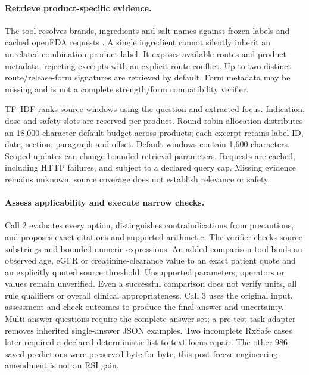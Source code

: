 \paragraph{Retrieve product-specific evidence.}
The tool resolves brands, ingredients and salt names against frozen labels and cached openFDA requests \citep{openfda}. A single ingredient cannot silently inherit an unrelated combination-product label. It exposes available routes and product metadata, rejecting excerpts with an explicit route conflict. Up to two distinct route/release-form signatures are retrieved by default. Form metadata may be missing and is not a complete strength/form compatibility verifier.

TF--IDF ranks source windows using the question and extracted focus. Indication, dose and safety slots are reserved per product. Round-robin allocation distributes an 18,000-character default budget across products; each excerpt retains label ID, date, section, paragraph and offset. Default windows contain 1,600 characters. Scoped updates can change bounded retrieval parameters. Requests are cached, including HTTP failures, and subject to a declared query cap. Missing evidence remains unknown; source coverage does not establish relevance or safety.

\paragraph{Assess applicability and execute narrow checks.}
Call 2 evaluates every option, distinguishes contraindications from precautions, and proposes exact citations and supported arithmetic. The verifier checks source substrings and bounded numeric expressions. An added comparison tool binds an observed age, eGFR or creatinine-clearance value to an exact patient quote and an explicitly quoted source threshold. Unsupported parameters, operators or values remain unverified. Even a successful comparison does not verify units, all rule qualifiers or overall clinical appropriateness. Call 3 uses the original input, assessment and check outcomes to produce the final answer and uncertainty. Multi-answer questions require the complete answer set; a pre-test task adapter removes inherited single-answer JSON examples. Two incomplete RxSafe cases later required a declared deterministic list-to-text focus repair. The other 986 saved predictions were preserved byte-for-byte; this post-freeze engineering amendment is not an RSI gain.

